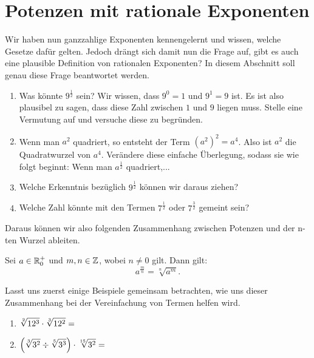 \documentclass[11pt,oneside]{article}
\begin{document}
\section{Potenzen mit rationale Exponenten}
	Wir haben nun ganzzahlige Exponenten kennengelernt und wissen, welche Gesetze dafür gelten. Jedoch drängt sich damit nun die Frage auf, gibt es auch eine plausible Definition von rationalen Exponenten? In diesem Abschnitt soll genau diese Frage beantwortet werden.
	\begin{aufgabe}
		\begin{enumerate}[label=\alph*)]
			\item Was könnte  $9^\frac{1}{2}$ sein? Wir wissen, dass $9^0=1$ und $9^1=9$ ist. Es ist also plausibel zu sagen, dass diese Zahl zwischen $1$ und $9$ liegen muss. Stelle eine Vermutung auf und versuche diese zu begründen.
		\end{enumerate}
		\begin{enumerate}[label=\alph*)]
			\setcounter{enumi}{1}
			\item \flqq Wenn man $a^2$ quadriert, so entsteht der Term $\left(a^2\right)^2=a^4$. Also ist $a^2$ die Quadratwurzel von $a^4$.\frqq\: Verändere diese einfache Überlegung, sodass sie wie folgt beginnt: \flqq Wenn man $a^\frac{1}{2}$ quadriert,...\frqq
		\end{enumerate}
		\begin{enumerate}[label=\alph*)]
			\setcounter{enumi}{2}
			\item Welche Erkenntnis bezüglich $9^\frac{1}{2}$ können wir daraus ziehen?
		\end{enumerate}
		\begin{enumerate}[label=\alph*)]
			\setcounter{enumi}{3}
			\item Welche Zahl könnte mit den Termen $7^\frac{1}{2}$ oder  $7^\frac{3}{2}$ gemeint sein?
		\end{enumerate}
	\end{aufgabe}
	Daraus können wir also folgenden Zusammenhang zwischen Potenzen und der n-ten Wurzel ableiten.
	\begin{definition}
		Sei $a\in\mathbb{R}_0^+$ und $m,n\in\mathbb{Z}$, wobei $n\neq 0$ gilt. Dann gilt: \[a^\frac{m}{n}=\sqrt[n]{a^m}.\]
	\end{definition}
	Lasst uns zuerst einige Beispiele gemeinsam betrachten, wie uns dieser Zusammenhang bei der Vereinfachung von Termen helfen wird.
	\begin{beispiel}
		\begin{enumerate}
			\item $\displaystyle\sqrt[2]{12^3}\cdot\sqrt[3]{12^2}=$\vspace{5pt}\newline{}
			\item $\displaystyle\left(\sqrt[3]{3^2}\div\sqrt[5]{3^3}\right)\cdot\sqrt[15]{3^2}=$\vspace{5pt}\newline{}
		\end{enumerate}
	\end{beispiel}
\end{document}
